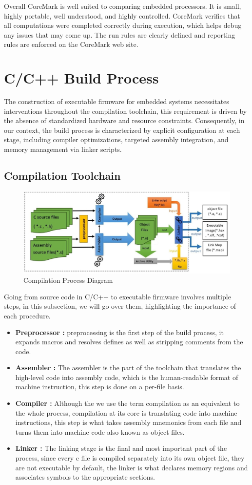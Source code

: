 Overall CoreMark is well suited to comparing embedded processors. It is small, highly
portable, well understood, and highly controlled. CoreMark verifies that all computations
were completed correctly during execution, which helps debug any issues that may come
up. The run rules are clearly defined and reporting rules are enforced on the CoreMark
web site.
\section{C/C++ Build Process}
The construction of executable firmware for embedded systems necessitates interventions throughout the compilation toolchain, this requirement is driven by the absence of standardized hardware and resource constraints. Consequently, in our context, the build process is characterized by explicit configuration at each stage, including compiler optimizations, targeted assembly integration, and memory management via linker scripts.
\subsection{Compilation Toolchain}
\begin{figure}[H]
  \centering
  \includegraphics[width=15cm]{img/comp_diag.jpeg}
  \caption{Compilation Process Diagram}
  \label{fig:compilation}
\end{figure}
Going from source code in C/C++ to executable firmware involves multiple steps, in this subsection, we will go over them, highlighting the importance of each procedure.
\begin{itemize}
    \item \textbf{Preprocessor :} preprocessing is the first step of the build process, it expands macros and resolves defines as well as stripping comments from the code.
    \item \textbf{Assembler :} The assembler is the part of the toolchain that translates the high-level code into assembly code, which is the human-readable format of machine instruction, this step is done on a per-file basis.
    \item \textbf{Compiler :} Although the we use the term compilation as an equivalent to the whole process, compilation at its core is translating code into machine instructions, this step is what takes assembly mnemonics from each file and turns them into machine code also known as object files.
    \item \textbf{Linker :} The linking stage is the final and most important part of the process, since every c file is compiled separately into its own object file, they are not executable by default, the linker is what declares memory regions and associates symbols to the appropriate sections.
\end{itemize}
